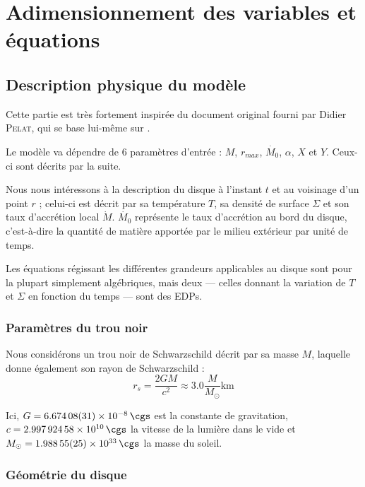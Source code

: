 \section{Adimensionnement des variables et équations}

\subsection{Description physique du modèle}

Cette partie est très fortement inspirée du document original fourni par Didier
\textsc{Pelat}, qui se base lui-même sur \citet{1984}.

Le modèle va dépendre de 6 paramètres d’entrée : $M$, $r_{max}$,
$\dot{M_0}$, $\alpha$, $X$ et $Y$. Ceux-ci sont décrits par la suite.

Nous nous intéressons à la description du disque à l’instant $t$ et au
voisinage d’un point $r$ ; celui-ci est décrit par sa température $T$, sa
densité de surface $\Sigma$ et son taux d’accrétion local $\dot{M}$.
$\dot{M_0}$ représente le taux d’accrétion au bord du disque, c’est-à-dire la
quantité de matière apportée par le milieu extérieur par unité de temps.

Les équations régissant les différentes grandeurs applicables au disque sont
pour la plupart simplement algébriques, mais deux — celles donnant la variation
de $T$ et $\Sigma$ en fonction du temps — sont des EDPs.

\subsubsection{Paramètres du trou noir}

Nous considérons un trou noir de Schwarzschild décrit par sa masse $M$,
laquelle donne également son rayon de Schwarzschild :
\begin{equation}
    \label{eq:rayon_schwarzschild}
    r_s = \frac{2 G M}{c^2} \approx 3.0 \frac{M}{M_{\odot}} \si{\kilo\meter}
\end{equation}

Ici, $G = \SI{6.67408(31)d-8}{\cgs}$ est la constante de gravitation, $c =
\SI{2.99792458e10}{\cgs}$ la vitesse de la lumière dans le vide et $M_{\odot} =
\SI{1.98855(25)d33}{\cgs}$ la masse du soleil.

\subsubsection{Géométrie du disque}

